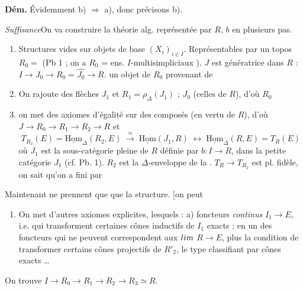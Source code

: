 \documentclass[11pt,a4paper]{article}
\begin{document}
\textbf{Dém.}\quad \struck{\ill{}} Évidemment b) $\Rightarrow$ a), donc
\struck{\ill{}} précisons \struck{\ill{}} b).

\emph{Suffisance}\quad On va construire la théorie alg. 
représentée par $R$, $b$ en plusieurs pas.

\begin{enumerate}
  \item[$1^{\circ}$)]  Structures vides sur objets de base
    $(X_i)_{i \in I}$. Représentables par un topos $R_0 =$ (Pb 1 ; on a
    $R_0$ = ens. \struck{\ill{}} $I$-multisimpliciaux \add{$\omega$}).
    $J$ est génératrice dans $R$ :
    $I \to J_0 \to R_0 = \hat{J_0} \to R$.
    \struck{\ill{}} un objet de $R_0$ provenant de \ill{}
  \item[$2^{\circ}$)] On rajoute des flèches \struck{\ill{}} $J_1$ et
    $R_1 = \rho_\Delta(J_1)$ ; $J_0$ (celles de $R$), d'où $R_0$ \struck{\ill{}}
  \item[$3^{\circ}$)] on met des axiomes d'égalité sur des composés (en vertu de
    $R$), d'où $J \to R_0 \to R_1 \to R_2 \to R$ et
    \[
      T_{R_2}(E) = \underline{\mathrm{Hom}}_{\Delta}(R_2, E)
      \;\xrightarrow{\ \approx\ }\; \underline{\mathrm{Hom}}(J_1, R)
      \;\longleftrightarrow\; \underline{\mathrm{Hom}}_{\Delta}(R, E) = T_R(E)
    \]
    où $J_1$ est la sous-catégorie pleine de $R$ définie par $b : I \to R$, dans
    la petite catégorie $J_1$ (cf. Pb. 1). $R_2$ est la $\Delta$-enveloppe de la
    \ill{}.  $T_R \to T_{R_2}$ est pl. fidèle, on sait qu'on a fini
    par \ill{}
\end{enumerate}

\struck{\ill{}} Maintenant \struck{\ill{}}  \ill{} ne
prennent que \ill{} \struck{\ill{}} que la structure. [on peut

\begin{enumerate}
  \item[$4^{\circ}$)] On met d'autres axiomes \struck{\ill{}} explicites,
    lesquels : a) foncteurs \emph{continus} $I_1 \to E$, i.e.
    \struck{\ill{}} qui transforment certaines 
     cônes inductifs de $I_1$
     exacts ;  en \ill{} un des
    foncteurs \ill{} qui ne peuvent \ill{} correspondent aux
    \emph{$\varprojlim$} $R \to E$, plus la condition de transformer
    certains  cônes projectifs \ill{} de $R'_2$, le type
    classifiant par \ill{} cônes exacts …
\end{enumerate}
On trouve $I \to R_0 \to R_1 \to R_2 \to R_3 \simeq R$.
\end{document}
